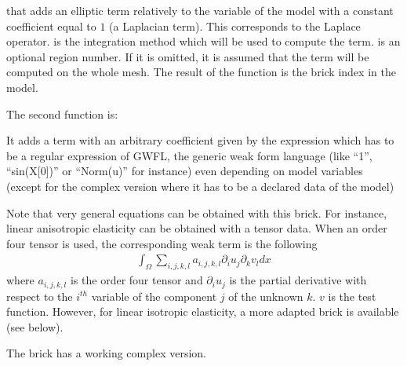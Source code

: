 \documentclass[a4paper,11pt,english]{sphinxmanual}
\begin{document}
that adds an elliptic term relatively to the variable  of the model
with a constant coefficient equal to \(1\) (a Laplacian term). This
corresponds to the Laplace operator.  is the integration method which will
be used to compute the term.  is an optional region number. If it is
omitted, it is assumed that the term will be computed on the whole mesh. The
result of the function is the brick index in the model.

The second function is:

\begin{sphinxVerbatim}[commandchars=\\\{\}]
       
\end{sphinxVerbatim}

It adds a term with an arbitrary coefficient given by the expression  which has to be a regular expression of GWFL, the generic weak form language (like “1”, “sin(X{[}0{]})” or “Norm(u)” for instance) even depending on model variables (except for the complex version where it has to be a declared data of the model)

Note that very general equations can be obtained with this brick. For instance,
linear anisotropic elasticity can be obtained with a tensor data. When an order
four tensor is used, the corresponding weak term is the following
\begin{equation*}
\begin{split}\int_{\Omega} \sum_{i,j,k,l} a_{i,j,k,l}\partial_i u_j \partial_k v_l dx\end{split}
\end{equation*}
where \(a_{i,j,k,l}\) is the order four tensor and \(\partial_i u_j\) is
the partial derivative with respect to the \(i^{th}\) variable of the
component \(j\) of the unknown \(k\). \(v\) is the test function.
However, for linear isotropic elasticity, a more adapted brick is available (see
below).

The brick has a working complex version.

\ignorespaces 
\end{document}
